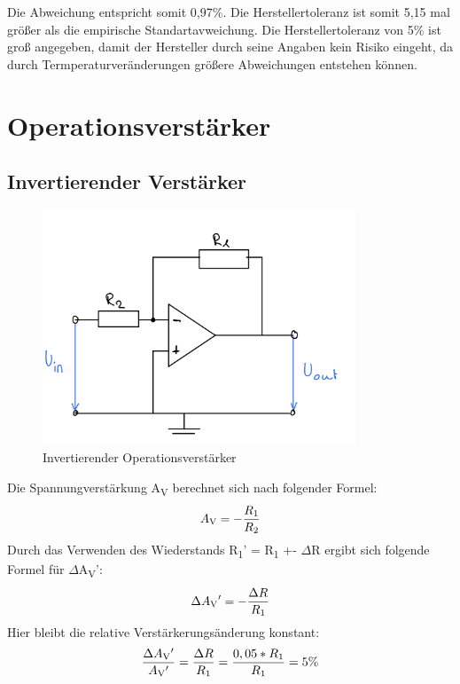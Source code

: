 Die Abweichung entspricht somit 0,97\%. Die Herstellertoleranz ist somit 5,15
mal größer als die empirische Standartavweichung. Die Herstellertoleranz 
von 5\% ist groß angegeben, damit der Hersteller durch seine Angaben
kein Risiko eingeht, da durch Termperaturveränderungen größere Abweichungen
entstehen können.

\section{Operationsverstärker}

\subsection{Invertierender Verstärker}
\begin{figure}[H]
	\centering
	\includegraphics[height=7cm]{images/Versuch5/invertierend-opamp.jpeg} 
	\caption{Invertierender Operationsverstärker}
	\label{fig: Invertierender Operationsverstärker}
\end{figure}
Die Spannungverstärkung A\textsubscript{V} berechnet sich nach folgender Formel:
\begin{equation}
	A\textsubscript{V} = - \frac{R\textsubscript{1}}{R\textsubscript{2}}
	\label{eq:AV2}
\end{equation}
Durch das Verwenden des Wiederstands R\textsubscript{1}' = R\textsubscript{1} +- $\Delta$R 
ergibt sich folgende Formel für $\Delta$A\textsubscript{V}':
\begin{equation}
	\Delta A\textsubscript{V}' = - \frac{\Delta R}{R\textsubscript{1}}
	\label{eq:AV2'}
\end{equation}
Hier bleibt die relative Verstärkerungsänderung konstant:
\begin{equation}
	\frac{\Delta A\textsubscript{V}'}{A\textsubscript{V}'} = \frac{\Delta R}{R\textsubscript{1}} = \frac{0,05 * R\textsubscript{1}}{R\textsubscript{1}} = 5\%
	\label{eq:AV2''}
\end{equation}

